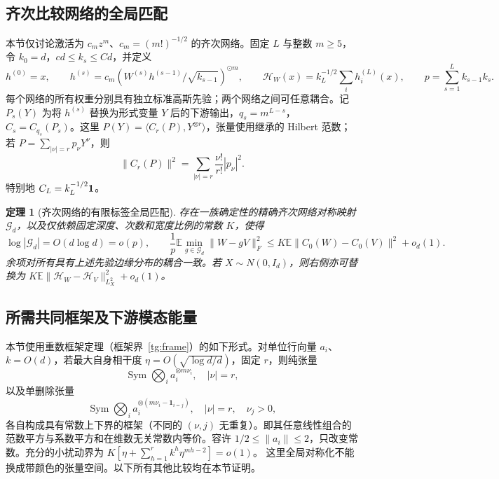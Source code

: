 \documentclass[a4paper]{tufte-handout}
\newtheorem{theorem}{定理}
\begin{document}
\begin{fullwidth}
\section{齐次比较网络的全局匹配}\label{hm:section}\label{app:matching}
本节仅讨论激活为 $c_m z^m$、$c_m=(m!)^{-1/2}$ 的齐次网络。固定 $L$ 与整数 $m\ge5$，令 $k_0=d$，$cd\le k_s\le Cd$，并定义
\[
 h^{(0)}=x,\qquad h^{(s)}=c_m(W^{(s)}h^{(s-1)}/\sqrt{k_{s-1}})^{\odot m},\qquad
 \mathcal H_W(x)=k_L^{-1/2}\sum_i h_i^{(L)}(x),\qquad
 p=\sum_{s=1}^L k_{s-1}k_s.
\]
每个网络的所有权重分别具有独立标准高斯先验；两个网络之间可任意耦合。记 $P_s(Y)$ 为将 $h^{(s)}$ 替换为形式变量 $Y$ 后的下游输出，$q_s=m^{L-s}$，$C_s=C_{q_s}(P_s)$。这里 $P(Y)=\langle C_r(P),Y^{\otimes r}\rangle$，张量使用继承的 Hilbert 范数；若 $P=\sum_{|\nu|=r}p_\nu Y^\nu$，则
\begin{equation}\label{hm:coeff-norm}
 \|C_r(P)\|^2=\sum_{|\nu|=r}\frac{\nu!}{r!}|p_\nu|^2.
\end{equation}
特别地 $C_L=k_L^{-1/2}{\bf1}$。

\begin{theorem}[齐次网络的有限标签全局匹配]\label{hm:global-matching}
存在一族确定性的精确齐次网络对称映射 $\mathcal G_d$，以及仅依赖固定深度、次数和宽度比例的常数 $K$，使得
\begin{equation}\label{hm:main}
 \log|\mathcal G_d|=O(d\log d)=o(p),\qquad
 \frac1p\mathbb E\min_{g\in\mathcal G_d}\|W-gV\|_F^2
 \le K\mathbb E\|C_0(W)-C_0(V)\|^2+o_d(1).
\end{equation}
余项对所有具有上述先验边缘分布的耦合一致。若 $X\sim N(0,I_d)$，则右侧亦可替换为
$K\mathbb E\|\mathcal H_W-\mathcal H_V\|_{L^2_X}^2+o_d(1)$。
\end{theorem}

\subsection{所需共同框架及下游模态能量}
本节使用重数框架定理（框架界~\eqref{tg:frame}）的如下形式。对单位行向量 $a_i$、$k=O(d)$，若最大自身相干度 $\eta=O(\sqrt{\log d/d})$，固定 $r$，则纯张量
\[
 \operatorname{Sym}\bigotimes_i a_i^{\otimes m\nu_i},\quad |\nu|=r,
\]
以及单删除张量
\[
 \operatorname{Sym}\bigotimes_i a_i^{\otimes(m\nu_i-\mathbf1_{i=j})},
 \quad |\nu|=r,\quad \nu_j>0,
\]
各自构成具有常数上下界的框架（不同的 $(\nu,j)$ 无重复）。即其任意线性组合的范数平方与系数平方和在维数无关常数内等价。容许 $1/2\le\|a_i\|\le2$，只改变常数。充分的小扰动界为
$K[\eta+\sum_{h=1}^r k^h\eta^{mh-2}]=o(1)$。
这里全局对称化不能换成带颜色的张量空间。以下所有其他比较均在本节证明。


\end{fullwidth}
\end{document}
